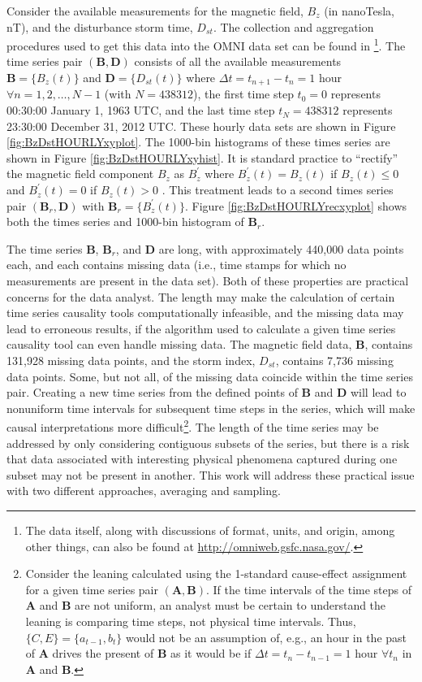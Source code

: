 \documentclass{article}[10pt]
\begin{document}
Consider the available measurements for the magnetic field, $B_z$ (in nanoTesla, nT), and the disturbance storm time, $D_{st}$.  The collection and aggregation procedures used to get this data into the OMNI data set can be found in \cite{King2005}\footnote{The data itself, along with discussions of format, units, and origin, among other things, can also be found at \url{http://omniweb.gsfc.nasa.gov/}.}.  The time series pair $(\mathbf{B},\mathbf{D})$ consists of all the available measurements $\mathbf{B} =\{B_z(t)\}$ and $\mathbf{D}=\{D_{st}(t)\}$ where $\Delta t=t_{n+1}-t_n=1$ hour $\forall n=1,2,\ldots,N-1$ (with $N=438312$), the first time step $t_0=0$ represents 00:30:00 January 1, 1963 UTC, and the last time step $t_N = 438312$ represents 23:30:00 December 31, 2012 UTC.  These hourly data sets are shown in Figure \ref{fig:BzDstHOURLYxyplot}.  The 1000-bin histograms of these times series are shown in Figure \ref{fig:BzDstHOURLYxyhist}.  It is standard practice to ``rectify'' the magnetic field component $B_z$ as $B_z^\prime$ where $B_z^\prime(t) = B_z(t)$ if $B_z(t)\le 0$ and $B_z^\prime(t) = 0$ if $B_z(t)>0$ \cite{Burton1975,Dungey1961}.  This treatment leads to a second times series pair $(\mathbf{B}_r,\mathbf{D})$ with $\mathbf{B}_r = \{B_z^\prime (t)\}$.  Figure \ref{fig:BzDstHOURLYrecxyplot} shows both the times series and 1000-bin histogram of $\mathbf{B}_r$.

The time series $\mathbf{B}$, $\mathbf{B}_r$, and $\mathbf{D}$ are long, with approximately 440,000 data points each, and each contains missing data (i.e., time stamps for which no measurements are present in the data set).  Both of these properties are practical concerns for the data analyst.  The length may make the calculation of certain time series causality tools computationally infeasible, and the missing data may lead to erroneous results, if the algorithm used to calculate a given time series causality tool can even handle missing data.  The magnetic field data, $\mathbf{B}$, contains 131,928 missing data points, and the storm index, $D_{st}$, contains 7,736 missing data points.  Some, but not all, of the missing data coincide within the time series pair.  Creating a new time series from the defined points of $\mathbf{B}$ and $\mathbf{D}$ will lead to nonuniform time intervals for subsequent time steps in the series, which will make causal interpretations more difficult\footnote{Consider the leaning calculated using the 1-standard cause-effect assignment for a given time series pair $(\mathbf{A},\mathbf{B})$.  If the time intervals of the time steps of $\mathbf{A}$ and $\mathbf{B}$ are not uniform, an analyst must be certain to understand the leaning is comparing time steps, not physical time intervals.  Thus, $\{C,E\}=\{a_{t-1},b_t\}$ would not be an assumption of, e.g., an hour in the past of $\mathbf{A}$ drives the present of $\mathbf{B}$ as it would be if $\Delta t = t_{n} - t_{n-1} = 1$ hour $\forall t_n$ in $\mathbf{A}$ and $\mathbf{B}$.}.  The length of the time series may be addressed by only considering contiguous subsets of the series, but there is a risk that data associated with interesting physical phenomena captured during one subset may not be present in another.  This work will address these practical issue with two different approaches, averaging and sampling.
\end{document}
